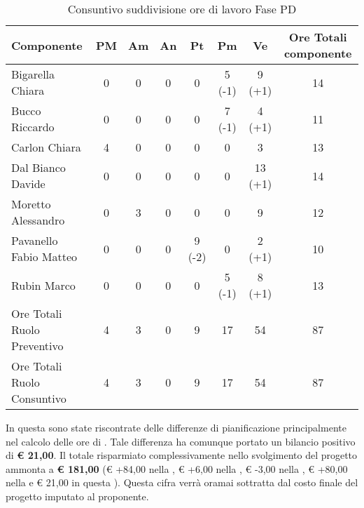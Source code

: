 			\begin{table}[H]
				\begin{center}
					\begin{tabular}{| l | c | c | c | c | c | c | c |}
						\hline
						Componente 					& PM	& Am 	& An 	& Pt 		& Pm 	& Ve 		& Ore Totali componente \\ \hline
						
						Bigarella Chiara 			& 0		& 0		& 0		& 0		& 5 (-1)		& 9 (+1)	& 14 \\
						Bucco Riccardo 				& 0		& 0		& 0		& 0		& 7 (-1)			& 4 (+1)		& 11 \\
						Carlon Chiara	 			& 4 	& 0		& 0		& 0		& 0			& 3 		& 13 \\
						Dal Bianco Davide 			& 0		& 0		& 0		& 0		& 0			& 13 (+1) 		& 14  \\
						Moretto Alessandro 			& 0		& 3 	& 0		& 0		& 0			& 9 		& 12 \\
						Pavanello Fabio Matteo	 	& 0		& 0		& 0		& 9 (-2) 	& 0			& 2 (+1)		& 10  \\
						Rubin Marco					& 0		& 0		& 0		& 0		& 5 (-1) 		& 8 (+1)		& 13 \\ \hline \hline
						
						Ore Totali Ruolo Preventivo 			& 4 	& 3 	& 0		& 9 	& 17 		& 54 		& 87\\
						Ore Totali Ruolo Consuntivo 			& 4 	& 3 	& 0		& 9 	& 17 		& 54 		& 87\\ \hline
					\end{tabular}
				\end{center}
				\caption{Consuntivo suddivisione ore di lavoro Fase PD}
			\end{table}

		In questa  sono state riscontrate delle differenze di pianificazione principalmente nel calcolo delle ore di . Tale differenza ha comunque portato un bilancio positivo di \textbf{\euro{} 21,00}.
		Il totale risparmiato complessivamente nello svolgimento del progetto ammonta a \textbf{\euro{} 181,00} (\euro{} +84,00 nella , \euro{} +6,00 nella , \euro{} -3,00 nella , \euro{} +80,00 nella  e \euro{} 21,00 in questa ). Questa cifra verrà oramai sottratta dal costo finale del progetto imputato al proponente.
	
